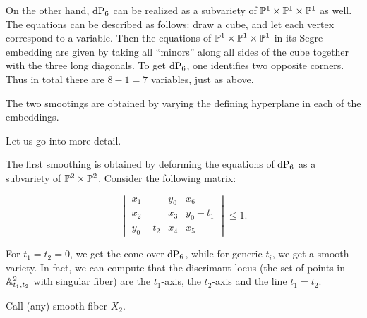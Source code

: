 On the other hand, $\dP6$ can be realized as a subvariety of $\P^1 \times \P^1 \times \P^1$ as well. The equations can be described as follows: draw a cube, and let each vertex correspond to a variable. Then the equations of $\P^1 \times \P^1 \times \P^1$ in its Segre embedding are given by taking all ``minors'' along all sides of the cube together with the three long diagonals. To get $\dP6$, one identifies two opposite corners. Thus in total there are $8-1=7$ variables, just as above. 

The two smootings are obtained by varying the defining hyperplane in each of the embeddings. 

Let us go into more detail.

The first smoothing is obtained by deforming the equations of $\dP6$ as a subvariety of $\P^2 \times \P^2$. Consider the following matrix:

\begin{equation}
\label{eq:def2}
\begin{vmatrix}
x_1 & y_0 & x_6 \\
x_2 & x_3 & y_0-t_1 \\
y_0-t_2 & x_4 & x_5
\end{vmatrix} \leq 1.
\end{equation}


For $t_1=t_2=0$, we get the cone over $\dP6$, while for generic $t_i$, we get a smooth variety. In fact, we can compute that the discrimant locus (the set of points in $\A^2_{t_1,t_2}$ with singular fiber) are the $t_1$-axis, the $t_2$-axis and the line $t_1=t_2$. 

Call (any) smooth fiber $X_2$. 

